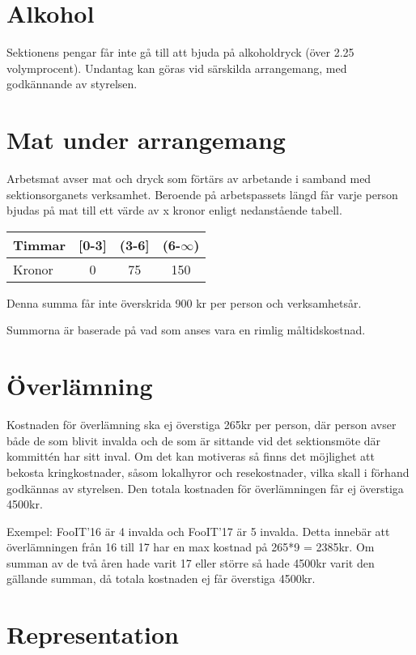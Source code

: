 \documentclass[11pt, includeaddress]{classes/cthit}
\begin{document}
\section{Alkohol}
Sektionens pengar får inte gå till att bjuda på alkoholdryck (över 2.25 volymprocent). Undantag kan göras vid särskilda arrangemang, med godkännande av styrelsen.

\section{Mat under arrangemang}
Arbetsmat avser mat och dryck som förtärs av arbetande i samband med sektionsorganets verksamhet. 
Beroende på arbetspassets längd får varje person bjudas på mat till ett värde av x kronor enligt nedanstående tabell.

\begin{tabular}{ l  c  c  c}
    \centering
    Timmar & [0-3] & (3-6] & (6-$\infty$) \\
    \hline
    Kronor & 0 & 75 & 150 \\
\end{tabular}
\vspace{\the\baselineskip}

    Denna summa får inte överskrida 900 kr per person och verksamhetsår.

    Summorna är baserade på vad som anses vara en rimlig
    måltidskostnad.


\section{Överlämning}
Kostnaden för överlämning ska ej överstiga 265kr per person, där person avser både de som blivit invalda och de som är sittande vid det sektionsmöte där kommittén har sitt inval. Om det kan motiveras så finns det möjlighet att bekosta kringkostnader, såsom lokalhyror och resekostnader, vilka skall i förhand godkännas av styrelsen. Den totala kostnaden för överlämningen får ej överstiga 4500kr.

Exempel: FooIT’16 är 4 invalda och FooIT’17 är 5 invalda. Detta innebär att överlämningen från 16 till 17 har en max kostnad på 265*9 = 2385kr. Om summan av de två åren hade varit 17 eller större så hade 4500kr varit den gällande summan, då totala kostnaden ej får överstiga 4500kr.

\section{Representation}
\end{document}
